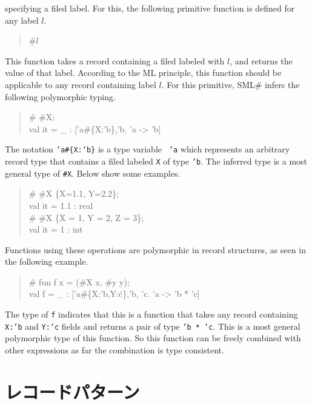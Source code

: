 \documentclass{jbook}
\newcommand{\txt}[2]{#2}
\newcommand{\smlsharp}{SML\#}
\newenvironment{program}{\begin{tt}\begin{quote}}{\end{quote}\end{tt}}
\begin{document}
specifying a filed label.
	For this, the following primitive function is defined for any
label $l$.
\begin{program}
\#$l$
\end{program}
	This function takes a record containing a filed labeled with
$l$, and returns the value of that label.
	According to the ML principle, this function should be
applicable to any record containing label $l$.
	For this primitive, \smlsharp{} infers the following
polymorphic typing.
\begin{program}
\# \#X;\\
val it = \_ : ['a\#\{X:'b\},'b. 'a -> 'b]
\end{program}
	The notation {\tt 'a\#\{X:'b\}} is a type variable {\tt
'a} which represents an arbitrary record type that contains a filed
labeled {\tt X} of type {\tt 'b}.
	The inferred type is a most general type of {\tt \#X}.
	Below show some examples.
\begin{program}
\# \#X \{X=1.1, Y=2.2\};\\
val it = 1.1 : real\\
\# \#X \{X = 1, Y = 2, Z = 3\};\\
val it = 1 : int
\end{program}
	Functions using these operations are polymorphic in record
structures, as seen in the following example.
\begin{tt}\begin{quote}
\# fun f x = (\#X x, \#y y);\\
val f = \_ : ['a\#\{X:'b,Y:\'c\},'b, 'c. 'a -> 'b * 'c]
\end{quote}\end{tt}
	The type of {\tt f} indicates that this is a function that takes
any record containing {\tt X:'b} and {\tt Y:'c} fields and returns a pair 
of type {\tt 'b * 'c}.
	This is a most general polymorphic type of this function.
	So this function can be freely combined with other expressions
as far the combination is type consistent.
\fi%

\section{\txt{レコードパターン}{レコードパターン}}
\label{sec:extensionRecordpattern}
\end{document}
